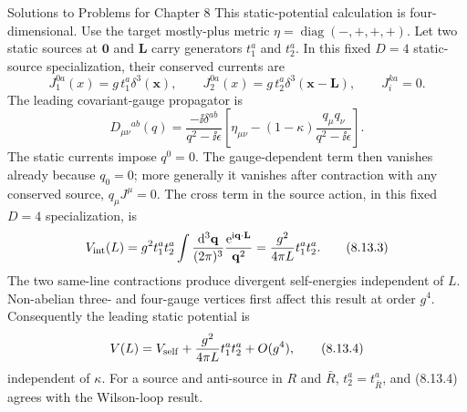 \begin{bankssolutions}{Solutions to Problems for Chapter 8}
This static-potential calculation is four-dimensional.  Use the target
mostly-plus metric $\eta=\operatorname{diag}(-,+,+,+)$.
Let two static sources at $\mathbf 0$ and $\mathbf L$ carry generators
$t_1^a$ and $t_2^a$.  In this fixed $D=4$ static-source specialization,
their conserved currents are
\[
  J_1^{0a}(x)=g\,t_1^a\delta^3(\mathbf x),
  \qquad
  J_2^{0a}(x)=g\,t_2^a\delta^3(\mathbf x-\mathbf L),
  \qquad J_i^{ka}=0 .
  \tag{8.13.1}
\]
The leading covariant-gauge propagator is
\[
  D_{\mu\nu}{}^{ab}(q)=\frac{-\ii\delta^{ab}}{q^2-\ii\epsilon}
  \left[\eta_{\mu\nu}-(1-\kappa)\frac{q_\mu q_\nu}{q^2-\ii\epsilon}\right].
  \tag{8.13.2}
\]
The static currents impose $q^0=0$.  The gauge-dependent term then vanishes
already because $q_0=0$; more generally it vanishes after contraction with any
conserved source, $q_\mu J^\mu=0$.  The cross term in the source action, in
this fixed $D=4$ specialization, is
\[
  V_{\rm int}(L)=g^2t_1^at_2^a
  \int\frac{\mathop{}\!\mathrm{d}^3\mathbf q}{(2\pi)^3}
  \frac{\mathrm{e}^{\mathrm{i}\mathbf q\cdot\mathbf L}}{\mathbf q^2}
  =\frac{g^2}{4\pi L}t_1^at_2^a .
  \tag{8.13.3}
\]
The two same-line contractions produce divergent self-energies independent of
$L$.  Non-abelian three- and four-gauge vertices first affect this result at
order $g^4$.  Consequently the leading static potential is
\[
  V(L)=V_{\rm self}+\frac{g^2}{4\pi L}t_1^at_2^a+O(g^4),
  \tag{8.13.4}
\]
independent of $\kappa$.  For a source and anti-source in $R$ and $\bar R$,
$t_2^a=t_{\bar R}^a$, and (8.13.4) agrees with the Wilson-loop result.


\end{bankssolutions}

